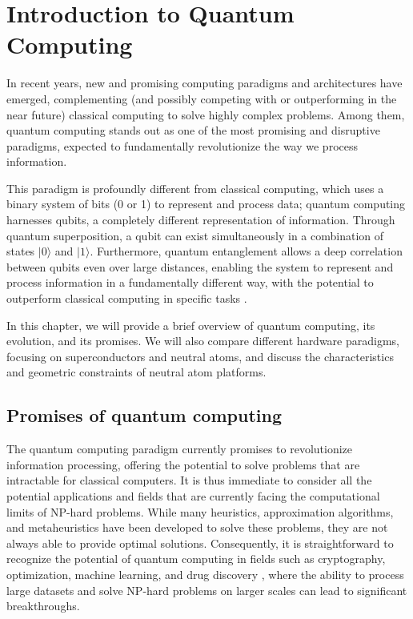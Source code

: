 \chapter{Introduction to Quantum Computing} \label{chap:introduction}

In recent years, new and promising computing paradigms and architectures have emerged, complementing (and possibly competing with or outperforming in the near future) classical computing to solve highly complex problems. Among them, quantum computing stands out as one of the most promising and disruptive paradigms, expected to fundamentally revolutionize the way we process information. 

This paradigm is profoundly different from classical computing, which uses a binary system of bits (0 or 1) to represent and process data; quantum computing harnesses qubits, a completely different representation of information. Through quantum superposition, a qubit can exist simultaneously in a combination of states $|0\rangle$ and $|1\rangle$. Furthermore, quantum entanglement allows a deep correlation between qubits even over large distances, enabling the system to represent and process information in a fundamentally different way, with the potential to outperform classical computing in specific tasks \cite{quantumReport, nielsen2010quantum}.

In this chapter, we will provide a brief overview of quantum computing, its evolution, and its promises. We will also compare different hardware paradigms, focusing on superconductors and neutral atoms, and discuss the characteristics and geometric constraints of neutral atom platforms.

\section{Promises of quantum computing}
\label{sec:evolution_promises}

The quantum computing paradigm currently promises to revolutionize information processing, offering the potential to solve problems that are intractable for classical computers. It is thus immediate to consider all the potential applications and fields that are currently facing the computational limits of NP-hard problems. While many heuristics, approximation algorithms, and metaheuristics have been developed to solve these problems, they are not always able to provide optimal solutions. Consequently, it is straightforward to recognize the potential of quantum computing in fields such as cryptography, optimization, machine learning, and drug discovery \cite{quantumReport}, where the ability to process large datasets and solve NP-hard problems on larger scales can lead to significant breakthroughs. 

